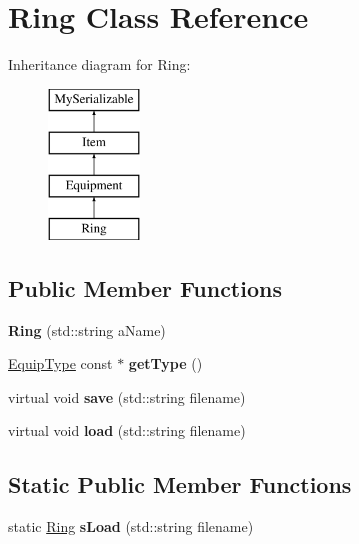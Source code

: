 \hypertarget{class_ring}{}\section{Ring Class Reference}
\label{class_ring}
Inheritance diagram for Ring\+:\begin{figure}[H]
\begin{center}
\leavevmode
\includegraphics[height=4.000000cm]{class_ring}
\end{center}
\end{figure}
\subsection*{Public Member Functions}
\begin{DoxyCompactItemize}
\item 
\hypertarget{class_ring_a7c6122977579015e8c065663fbda65af}{}\label{class_ring_a7c6122977579015e8c065663fbda65af} 
{\bfseries Ring} (std\+::string a\+Name)
\item 
\hypertarget{class_ring_a0191f59fb68ddf34ebcb99e3f24ab494}{}\label{class_ring_a0191f59fb68ddf34ebcb99e3f24ab494} 
\hyperlink{class_equip_type}{Equip\+Type} const  $\ast$ {\bfseries get\+Type} ()
\item 
\hypertarget{class_ring_aff7a3645b12cf93682ffbf36a7e4cc12}{}\label{class_ring_aff7a3645b12cf93682ffbf36a7e4cc12} 
virtual void {\bfseries save} (std\+::string filename)
\item 
\hypertarget{class_ring_abf9eadeb142d0e70fe1d6caeded4fa90}{}\label{class_ring_abf9eadeb142d0e70fe1d6caeded4fa90} 
virtual void {\bfseries load} (std\+::string filename)
\end{DoxyCompactItemize}
\subsection*{Static Public Member Functions}
\begin{DoxyCompactItemize}
\item 
\hypertarget{class_ring_a57af1c46d6d51c36dcc2b9eec412132b}{}\label{class_ring_a57af1c46d6d51c36dcc2b9eec412132b} 
static \hyperlink{class_ring}{Ring} {\bfseries s\+Load} (std\+::string filename)
\end{DoxyCompactItemize}
